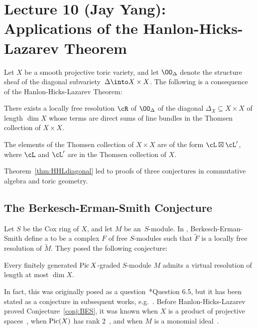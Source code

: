\documentclass{amsart}
\begin{document}
\fi

\section{Lecture 10 (Jay Yang): Applications of the Hanlon-Hicks-Lazarev Theorem}\label{lec:10-applications}

Let $X$ be a smooth projective toric variety, and let $\OO_\Delta$ denote the structure sheaf of the diagonal subvariety~$\Delta \into X \times X$. The following is a consequence of the Hanlon-Hicks-Lazarev Theorem:

\begin{thm}
\label{thm:HHLdiagonal}

There exists a locally free resolution $\cR$ of $\OO_\Delta$ of the diagonal $\Delta_X \subseteq X \times X$ of length $\dim{X}$ whose terms are direct sums of line bundles in the Thomsen collection of $X \times X$.
\end{thm}

\begin{remark}
The elements of the Thomsen collection of $X \times X$ are of the form $\cL \boxtimes \cL'$, where $\cL$ and $\cL'$ are in the Thomsen collection of $X$.
\end{remark}

Theorem~\ref{thm:HHLdiagonal} led to proofs of three conjectures in commutative algebra and toric geometry.

\subsection{The Berkesch-Erman-Smith Conjecture} Let $S$ be the Cox ring of $X$, and let $M$ be an~$S$-module. In \cite{BES20}, Berkesch-Erman-Smith define a  to be a complex $F$ of free $S$-modules such that $\widetilde{F}$ is a locally free resolution of $\widetilde{M}$. They posed the following conjecture:

\begin{conj}
\label{conj:BES}
Every finitely generated $\operatorname{Pic}{X}$-graded $S$-module $M$ admits a virtual resolution of length at most $\dim{X}$.
\end{conj}

In fact, this was originally posed as a question~\cite{BES20}*{Question 6.5}, but it has been stated as a conjecture in subsequent works, e.g.~\cites{Yang21a,BS24}. Before Hanlon-Hicks-Lazarev proved Conjecture~\ref{conj:BES}, it was known when $X$ is a product of projective spaces~\cite{BES20}, when $\operatorname{Pic}(X)$ has rank 2~\cite{BS24}, and when $M$ is a monomial ideal~\cite{Yang21a}.
\end{document}
